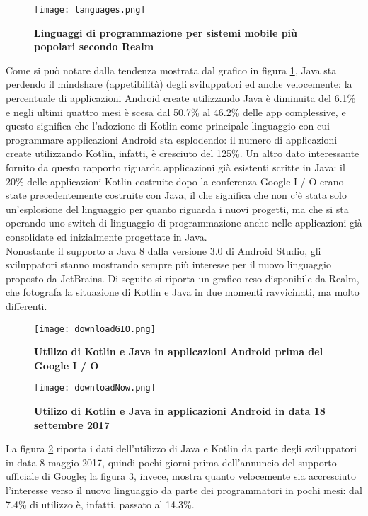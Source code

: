 \begin{figure}[ht]
  \centering
  \texttt{[image: languages.png]}
  \caption{{\bfseries Linguaggi di programmazione per sistemi mobile più popolari secondo Realm}}
  \label{languages}
\end{figure}

Come si può notare dalla tendenza mostrata dal grafico in figura \ref{languages}, Java sta perdendo il mindshare (appetibilità) degli sviluppatori ed anche velocemente: la percentuale di applicazioni Android create utilizzando Java è diminuita del 6.1\% e negli ultimi quattro mesi è scesa dal 50.7\% al 46.2\% delle app complessive, e questo significa che l'adozione di Kotlin come principale linguaggio con cui programmare applicazioni Android sta esplodendo: il numero di applicazioni create utilizzando Kotlin, infatti, è cresciuto del 125\%. Un altro dato interessante fornito da questo rapporto riguarda applicazioni già esistenti scritte in Java: il 20\% delle applicazioni Kotlin costruite dopo la conferenza Google I / O erano state precedentemente costruite con Java, il che significa che non c'è stata solo un'esplosione del linguaggio per quanto riguarda i nuovi progetti, ma che si sta operando uno switch di linguaggio di programmazione anche nelle applicazioni già consolidate ed inizialmente progettate in Java.\\
Nonostante il supporto a Java 8 dalla versione 3.0 di Android Studio, gli sviluppatori stanno mostrando sempre più interesse per il nuovo linguaggio proposto da JetBrains. Di seguito si riporta un grafico reso disponibile da Realm, che fotografa la situazione di Kotlin e Java in due momenti ravvicinati, ma molto differenti.\\

\begin{figure}[ht]
  \centering
  \texttt{[image: downloadGIO.png]}
  \caption{{\bfseries Utilizo di Kotlin e Java in applicazioni Android prima del Google I / O}}
  \label{gio}
\end{figure}

\begin{figure}[ht]
  \centering
  \texttt{[image: downloadNow.png]}
  \caption{{\bfseries Utilizo di Kotlin e Java in applicazioni Android in data 18 settembre 2017}}
  \label{now}
\end{figure}

La figura \ref{gio} riporta i dati dell'utilizzo di Java e Kotlin da parte degli sviluppatori in data 8 maggio 2017, quindi pochi giorni prima dell'annuncio del supporto ufficiale di Google; la figura \ref{now}, invece, mostra quanto velocemente sia accresciuto l'interesse verso il nuovo linguaggio da parte dei programmatori in pochi mesi: dal 7.4\% di utilizzo è, infatti, passato al 14.3\%.\\

